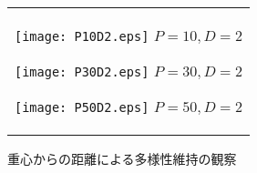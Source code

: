 \documentclass[a4paper,11pt,oneside,openany]{jsbook}
\begin{document}
\begin{figure}[htbp]
  \begin{center}
  \caption{重心からの距離による多様性維持の観察}
    \begin{tabular}{c}


      \begin{minipage}{0.33\hsize}
        \begin{center}
          \texttt{[image: P10D2.eps]}
          \hspace{1.2cm}$P=10, D=2
 $       \end{center}
      \end{minipage}

      \begin{minipage}{0.33\hsize}
        \begin{center}
          \texttt{[image: P30D2.eps]}
          \hspace{1.2cm}$P=30, D=2
 $       \end{center}
      \end{minipage}

      \begin{minipage}{0.33\hsize}
        \begin{center}
          \texttt{[image: P50D2.eps]}
          \hspace{1.2cm}$P=50, D=2
 $       \end{center}
      \end{minipage}
    \end{tabular}
  \end{center}
\end{figure}
\end{document}

